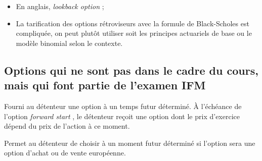 \documentclass[10pt, french]{article}
\begin{document}
\begin{multicols*}{2}
\begin{definitionNOHFILL}
\tcbline

\begin{itemize}[leftmargin = *]
	\item	En anglais, \og \textit{lookback option} \fg{};
	\item	La tarification des options rétroviseurs avec la formule de Black-Scholes est compliquée, on peut plutôt utiliser soit les principes actuariels de base ou le modèle binomial selon le contexte.
\end{itemize}
\end{definitionNOHFILL}

\columnbreak
\subsection{Options qui ne sont pas dans le cadre du cours, mais qui font partie de l'examen IFM}
\begin{definitionNOHFILLsub}
Fourni au détenteur une option à un temps futur déterminé. À l'échéance de l'option \og \textit{forward start} \fg{}, le détenteur reçoit une option dont le prix d'exercice dépend du prix de l'action à ce moment.	
\end{definitionNOHFILLsub}

\begin{definitionNOHFILLsub}
Permet au détenteur de choisir à un moment futur déterminé si l'option sera une option d'achat ou de vente européenne.
\end{definitionNOHFILLsub}

\end{multicols*}




\newpage
\end{document}
